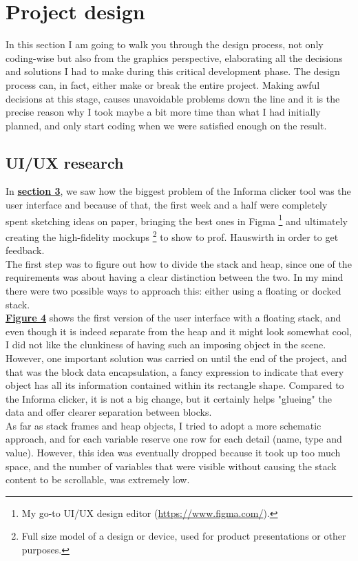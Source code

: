 \documentclass[]{usiinfbachelorproject}
\begin{document}
\section{Project design} \label{design}

In this section I am going to walk you through the design process, not only coding-wise but also from the graphics perspective, elaborating all the decisions and solutions I had to make during this critical development phase. The design process can, in fact, either make or break the entire project. Making awful decisions at this stage, causes unavoidable problems down the line and it is the precise reason why I took maybe a bit more time than what I had initially planned, and only start coding when we were satisfied enough on the result.

\subsection{UI/UX research} \label{ui-ux research}

In \hyperref[requirements+analysis]{\textbf{section 3}}, we saw how the biggest problem of the Informa clicker tool was the user interface and because of that, the first week and a half were completely spent sketching ideas on paper, bringing the best ones in Figma \footnote{My go-to UI/UX design editor (\url{https://www.figma.com/}).} and ultimately creating the high-fidelity mockups \footnote{Full size model of a design or device, used for product presentations or other purposes.} to show to prof. Hauswirth in order to get feedback.\\
The first step was to figure out how to divide the stack and heap, since one of the requirements was about having a clear distinction between the two. In my mind there were two possible ways to approach this: either using a floating or docked stack.\\

\noindent \hyperref[floating stack]{\textbf{Figure 4}} shows the first version of the user interface with a floating stack, and even though it is indeed separate from the heap and it might look somewhat cool, I did not like the clunkiness of having such an imposing object in the scene. However, one important solution was carried on until the end of the project, and that was the block data encapsulation, a fancy expression to indicate that every object has all its information contained within its rectangle shape. Compared to the Informa clicker, it is not a big change, but it certainly helps "glueing" the data and offer clearer separation between blocks.\\
As far as stack frames and heap objects, I tried to adopt a more schematic approach, and for each variable reserve one row for each detail (name, type and value). However, this idea was eventually dropped because it took up too much space, and the number of variables that were visible without causing the stack content to be scrollable, was extremely low. 
\end{document}
